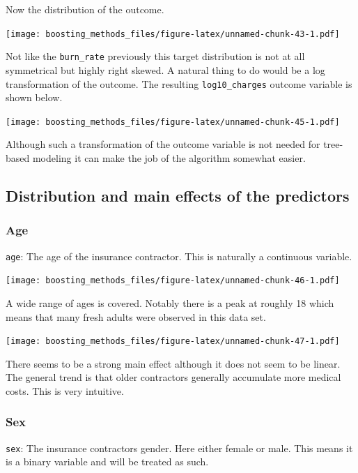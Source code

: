 \documentclass[
]{book}
\begin{document}
Now the distribution of the outcome.

\texttt{[image: boosting\_methods\_files/figure-latex/unnamed-chunk-43-1.pdf]}

Not like the \texttt{burn\_rate} previously this target distribution is not at all symmetrical but highly right skewed. A natural thing to do would be a log transformation of the outcome. The resulting \texttt{log10\_charges} outcome variable is shown below.

\texttt{[image: boosting\_methods\_files/figure-latex/unnamed-chunk-45-1.pdf]}

Although such a transformation of the outcome variable is not needed for tree-based modeling it can make the job of the algorithm somewhat easier.

\hypertarget{distribution-and-main-effects-of-the-predictors-1}{%
\subsection{Distribution and main effects of the predictors}\label{distribution-and-main-effects-of-the-predictors-1}}

\hypertarget{age}{%
\subsubsection{Age}\label{age}}

\texttt{age}: The age of the insurance contractor. This is naturally a continuous variable.

\texttt{[image: boosting\_methods\_files/figure-latex/unnamed-chunk-46-1.pdf]}

A wide range of ages is covered. Notably there is a peak at roughly 18 which means that many fresh adults were observed in this data set.

\texttt{[image: boosting\_methods\_files/figure-latex/unnamed-chunk-47-1.pdf]}

There seems to be a strong main effect although it does not seem to be linear. The general trend is that older contractors generally accumulate more medical costs. This is very intuitive.

\hypertarget{sex}{%
\subsubsection{Sex}\label{sex}}

\texttt{sex}: The insurance contractors gender. Here either female or male. This means it is a binary variable and will be treated as such.
\end{document}
